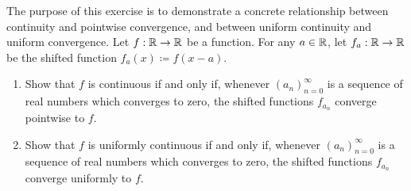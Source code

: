 \exercisesection

\begin{ex}\label{ex:3.2.1}
  The purpose of this exercise is to demonstrate a concrete relationship between continuity and pointwise convergence, and between uniform continuity and uniform convergence.
  Let \(f : \mathbb{R} \to \mathbb{R}\) be a function.
  For any \(a \in \mathbb{R}\), let \(f_a : \mathbb{R} \to \mathbb{R}\) be the shifted function \(f_a(x) \coloneqq f(x - a)\).
  \begin{enumerate}
    \item Show that \(f\) is continuous if and only if, whenever \((a_n)_{n = 0}^\infty\) is a sequence of real numbers which converges to zero, the shifted functions \(f_{a_n}\) converge pointwise to \(f\).
    \item Show that \(f\) is uniformly continuous if and only if, whenever \((a_n)_{n = 0}^\infty\) is a sequence of real numbers which converges to zero, the shifted functions \(f_{a_n}\) converge uniformly to \(f\).
  \end{enumerate}
\end{ex}

